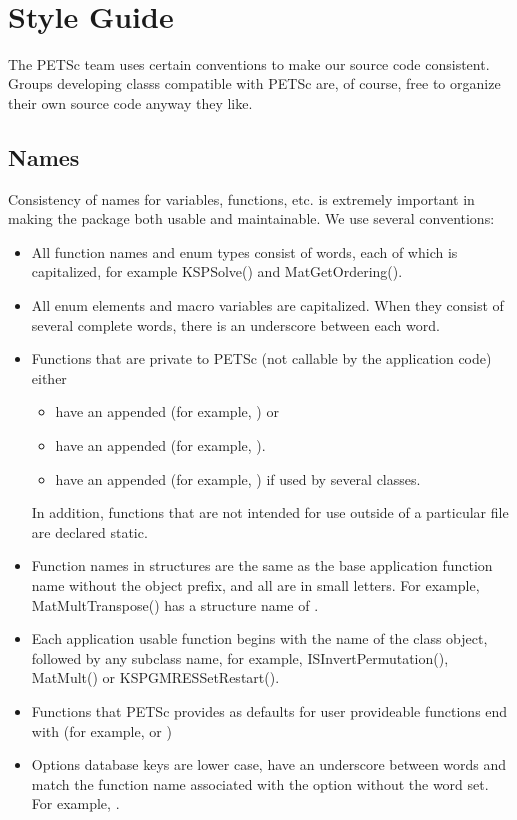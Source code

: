 \documentclass[twoside,12pt]{../sty/report_petsc}
\begin{document}
\newpage
\hbox{ }
\newpage

\tableofcontents

\chapter{Style Guide}

The PETSc team uses certain conventions to make our source code consistent. Groups
developing classs compatible with PETSc are, of course, free to organize their
own source code anyway they like.

\section{Names}
Consistency of names for variables, functions, etc. is extremely
important in making the package both usable and maintainable.
We use several conventions:
\begin{itemize}
\item All function names and enum types consist of words, each of
      which is capitalized, for example KSPSolve() and
      MatGetOrdering().
\item All enum elements and macro variables are capitalized. When
      they consist of several complete words, there is an underscore between each word.
\item Functions that are private to PETSc (not callable by the
      application code) either
      \begin{itemize}
        \item have an appended  (for example,
           ) or
        \item have an appended  (for example,
           ).
        \item have an appended  (for example,
           ) if used by several classes.
      \end{itemize}

      In addition, functions that are not intended for use outside
      of a particular file are declared static.
\item Function names in structures are the same as the base application
      function name without the object prefix, and all are in small letters.
      For example, MatMultTranspose() has a structure name of
      .
\item Each application usable function begins with the name of the class object, followed by any subclass name,
      for example, ISInvertPermutation(), MatMult() or KSPGMRESSetRestart().
\item Functions that PETSc provides as defaults for user provideable functions end with  (for example,  or )
\item Options database keys are lower case, have an underscore between words and match the function name associated with the option without the word set. For example, .
\end{itemize}
\end{document}
